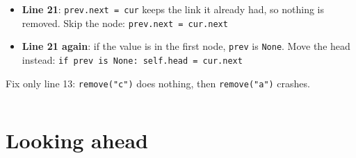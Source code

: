 \documentclass[aspectratio=169]{beamer}
\newcommand{\code}[1]{\texttt{#1}}
\begin{document}
\begin{frame}
\begin{columns}[T,onlytextwidth]
\begin{onlyenv}
\begin{itemize}[itemsep=0.1em, topsep=0.1em, leftmargin=1em]
            no node to link from. Stop \textbf{at} it:
            \code{while cur.next is not None:}
      \item \textbf{Line 21}: \code{prev.next = cur} keeps the link it already
            had, so nothing is removed. Skip the node: \code{prev.next = cur.next}
      \item \textbf{Line 21 again}: if the value is in the first node,
            \code{prev} is \code{None}. Move the head instead:
            \code{if prev is None: self.head = cur.next}
    \end{itemize}
    {\footnotesize Fix only line 13: \code{remove("c")} does nothing, then
    \code{remove("a")} crashes.}
    \end{onlyenv}
  \end{columns}
\end{frame}

\section{Looking ahead}
\end{document}
